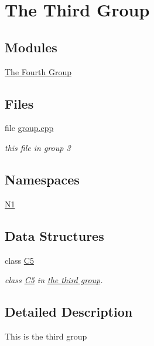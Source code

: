 \hypertarget{group__group3}{}\section{The Third Group}
\label{group__group3}
\subsection*{Modules}
\begin{DoxyCompactItemize}
\item 
\hyperlink{group__group4}{The Fourth Group}
\end{DoxyCompactItemize}
\subsection*{Files}
\begin{DoxyCompactItemize}
\item 
file \hyperlink{group_8cpp}{group.\+cpp}
\begin{DoxyCompactList}\small\item\em this file in group 3 \end{DoxyCompactList}\end{DoxyCompactItemize}
\subsection*{Namespaces}
\begin{DoxyCompactItemize}
\item 
 \hyperlink{namespace_n1}{N1}
\end{DoxyCompactItemize}
\subsection*{Data Structures}
\begin{DoxyCompactItemize}
\item 
class \hyperlink{class_c5}{C5}
\begin{DoxyCompactList}\small\item\em class \hyperlink{class_c5}{C5} in \hyperlink{group__group3}{the third group}. \end{DoxyCompactList}\end{DoxyCompactItemize}


\subsection{Detailed Description}
This is the third group 